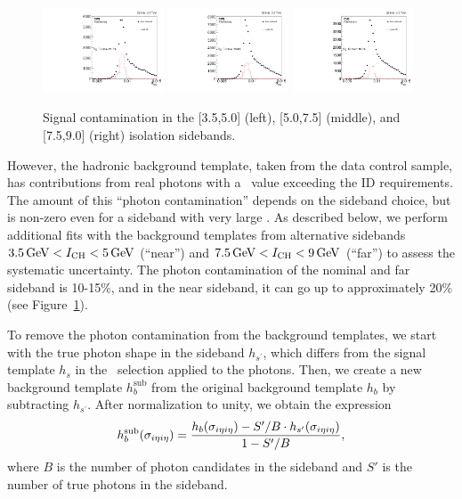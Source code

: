\begin{figure}[htbp]
  \centering
  \includegraphics[width=0.32\textwidth]{Calibration/Figures/pvsf/sbcontam_near.pdf}
  \includegraphics[width=0.32\textwidth]{Calibration/Figures/pvsf/sbcontam_nominal.pdf}
  \includegraphics[width=0.32\textwidth]{Calibration/Figures/pvsf/sbcontam_far.pdf}
  \caption{
    Signal contamination in the [3.5,5.0] (left), [5.0,7.5] (middle), and [7.5,9.0] (right) isolation sidebands.
  }
  \label{fig:impurity-signal-contamination}
\end{figure}

However, the hadronic background template, taken from the data control sample, has contributions from real photons with a \ICH\ value exceeding the ID requirements. 
The amount of this ``photon contamination'' depends on the sideband choice, but is non-zero even for a sideband with very large \ICH. 
As described below, we perform additional fits with the background templates from alternative sidebands $3.5\,\text{Ge\hspace{-.08em}V} < I_{\text{CH}} < 5\,\text{Ge\hspace{-.08em}V}$ (``near'') and $7.5\,\text{Ge\hspace{-.08em}V} < I_{\text{CH}} < 9\,\text{Ge\hspace{-.08em}V}$ (``far'') to assess the systematic uncertainty. 
The photon contamination of the nominal and far sideband is 10-15\%, and in the near sideband, it can go up to approximately 20\% (see Figure~\ref{fig:impurity-signal-contamination}).

To remove the photon contamination from the background templates, we start with the true photon shape in the sideband $h_{s^{'}}$, which differs from the signal template $h_{s}$ in the \ICH\ selection applied to the photons.
Then, we create a new background template $h_{b}^{\text{sub}}$ from the original background template $h_{b}$ by subtracting $h_{s^{'}}$. 
After normalization to unity, we obtain the expression
\begin{align}
  h_{b}^{\text{sub}}(\sigma_{i\eta i\eta}) = \frac{h_{b}(\sigma_{i\eta i\eta}) - S'/B \cdot h_{s'}(\sigma_{i\eta i\eta})}{1 - S'/B},
\end{align}
where $B$ is the number of photon candidates in the sideband and $S'$ is the number of true photons in the sideband.

